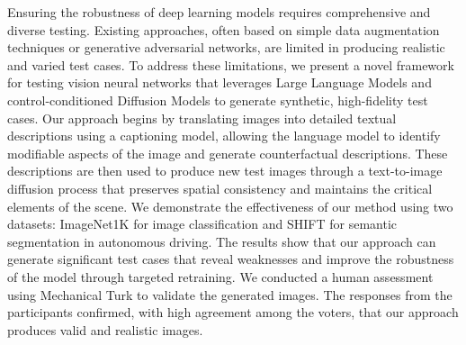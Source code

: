 Ensuring the robustness of deep learning models requires comprehensive and diverse testing. Existing approaches, often based on simple data augmentation techniques or generative adversarial networks, are limited in producing realistic and varied test cases. To address these limitations, we present a novel framework for testing vision neural networks that leverages Large Language Models and control-conditioned Diffusion Models to generate synthetic, high-fidelity test cases. Our approach begins by translating images into detailed textual descriptions using a captioning model, allowing the language model to identify modifiable aspects of the image and generate counterfactual descriptions. These descriptions are then used to produce new test images through a text-to-image diffusion process that preserves spatial consistency and maintains the critical elements of the scene. We demonstrate the effectiveness of our method using two datasets: ImageNet1K for image classification and SHIFT for semantic segmentation in autonomous driving. The results show that our approach can generate significant test cases that reveal weaknesses and improve the robustness of the model through targeted retraining. We conducted a human assessment using Mechanical Turk to validate the generated images. The responses from the participants confirmed, with high agreement among the voters, that our approach produces valid and realistic images.
